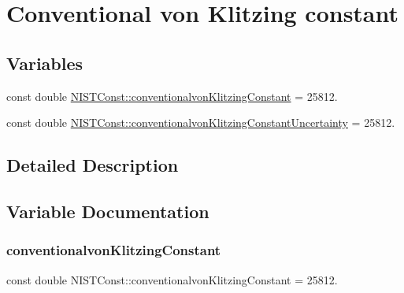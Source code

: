 \hypertarget{group___n_i_s_t_const-_conventionalvon_klitzing_constant}{}\section{Conventional von Klitzing constant}
\label{group___n_i_s_t_const-_conventionalvon_klitzing_constant}
\subsection*{Variables}
\begin{DoxyCompactItemize}
\item 
const double \hyperlink{group___n_i_s_t_const-_conventionalvon_klitzing_constant_gabf641ec13f8a8d63762992724dd6d670}{N\+I\+S\+T\+Const\+::conventionalvon\+Klitzing\+Constant} = 25812.
\item 
const double \hyperlink{group___n_i_s_t_const-_conventionalvon_klitzing_constant_gad820d4afd8b26103c01023bf69ac749b}{N\+I\+S\+T\+Const\+::conventionalvon\+Klitzing\+Constant\+Uncertainty} = 25812.
\end{DoxyCompactItemize}


\subsection{Detailed Description}


\subsection{Variable Documentation}
\mbox{\label{group___n_i_s_t_const-_conventionalvon_klitzing_constant_gabf641ec13f8a8d63762992724dd6d670}} 
\subsubsection{\texorpdfstring{conventionalvon\+Klitzing\+Constant}{conventionalvonKlitzingConstant}}
{\footnotesize\ttfamily const double N\+I\+S\+T\+Const\+::conventionalvon\+Klitzing\+Constant = 25812.}

